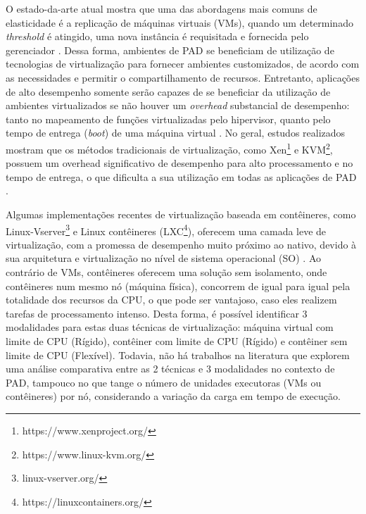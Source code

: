 \documentclass[twoside,english,brazilian]{UNISINOSartigo}
\begin{document}
O estado-da-arte atual mostra que uma das abordagens mais comuns de elasticidade é a replicação de máquinas virtuais (VMs), quando um determinado \textit{threshold} é atingido, uma nova instância é requisitada e fornecida pelo gerenciador \cite{7090978,7185168,6217477}. Dessa forma, ambientes de PAD se beneficiam de utilização de tecnologias de virtualização para fornecer ambientes customizados, de acordo com as necessidades e permitir o compartilhamento de recursos. Entretanto, aplicações de alto desempenho somente serão capazes de se beneficiar da utilização de ambientes virtualizados se não houver um \textit{overhead} substancial de desempenho: tanto no mapeamento de funções virtualizadas pelo hipervisor, quanto pelo tempo de entrega (\textit{boot}) de uma máquina virtual \cite{Xavier2013}. No geral, estudos realizados mostram que os métodos tradicionais de virtualização, como Xen\footnote{https://www.xenproject.org/} e KVM\footnote{https://www.linux-kvm.org/
}, possuem um overhead significativo de desempenho para alto processamento e no tempo de entrega, o que dificulta a sua utilização em todas as aplicações de PAD \cite{Zheng2017}. 

Algumas implementações recentes de virtualização baseada em contêineres, como Linux-Vserver\footnote{linux-vserver.org/} e Linux contêineres (LXC\footnote{https://linuxcontainers.org/}), oferecem uma camada leve de virtualização, com a promessa de desempenho muito próximo ao nativo, devido à sua arquitetura e virtualização no nível de sistema operacional (SO) \cite{Bernstein2014}. Ao contrário de VMs, contêineres oferecem uma solução sem isolamento, onde contêineres num mesmo nó (máquina física), concorrem de igual para igual pela totalidade dos recursos da CPU, o que pode ser vantajoso, caso eles realizem tarefas de processamento intenso. Desta forma, é possível identificar 3 modalidades para estas duas técnicas de virtualização: máquina virtual com limite de CPU (Rígido), contêiner com limite de CPU (Rígido) e contêiner sem limite de CPU (Flexível). Todavia, não há trabalhos na literatura que explorem uma análise comparativa entre as 2 técnicas e 3 modalidades no contexto de PAD, tampouco no que tange o número de unidades executoras (VMs ou contêineres) por nó, considerando a variação da carga em tempo de execução.
\end{document}
